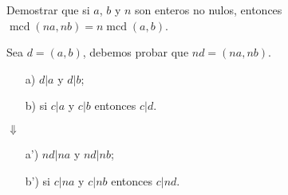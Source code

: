 \documentclass[handout]{beamer} %
\newcommand{\mcd}{\operatorname{mcd}}
\newcommand{\mcm}{\operatorname{mcm}}
\begin{document}
    
    
    
    
    
    \begin{frame}
        \begin{ejercicio}
            Demostrar que si $a$, $b$ y $n$ son enteros no nulos, entonces
            $\mcd(na,nb)=n\mcd(a,b)$.
        \end{ejercicio}\pause
        \begin{solucion}\pause
            Sea $d = (a,b)$, debemos probar que $ nd = (na,nb)$.\pause
            
            \begin{enumerate}
                \item[{\color{blue}a)}] $ d|a$  y $d|b$;
                \item[{\color{blue}b)}]  si $ c|a $ y $c|b$ entonces $ c|d$.
            \end{enumerate}\pause
            
            \qquad\qquad $\Downarrow$
            
            \begin{enumerate}\pause
                \item[{\color{blue}a')}] $ nd|na$  y $nd|nb$;
                \item[{\color{blue}b')}]  si $ c|na $ y $c|nb$ entonces $ c|nd$.
            \end{enumerate}
        \end{solucion}
    \end{frame}
    
\end{document}
